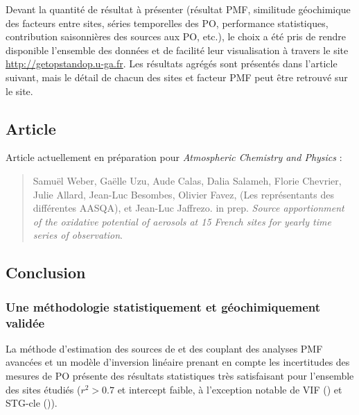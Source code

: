 \begin{tcolorbox}[colback=red!5!white,colframe=Melon,title=Note]
    Devant la quantité de résultat à présenter (résultat PMF, similitude géochimique des
    facteurs entre sites, séries temporelles des PO, performance statistiques,
    contribution saisonnières des sources aux PO, etc.), le choix a été pris de rendre
    disponible l'ensemble des données et de facilité leur visualisation à travers le site
    \url{http://getopstandop.u-ga.fr}.
    Les résultats agrégés sont présentés dans l'article suivant, mais le détail de chacun
    des sites et facteur PMF peut être retrouvé sur le site.
\end{tcolorbox}

\subsection{Article}%
\label{sub:article}

\begin{tcolorbox}[colback=red!5!white,colframe=Melon,title=Note]
Article actuellement en préparation pour \textit{Atmospheric Chemistry and Physics} :
\begin{quote}
    Samuël Weber, Gaëlle Uzu, Aude Calas, Dalia Salameh, Florie Chevrier, Julie Allard,
    Jean-Luc Besombes, Olivier Favez, (Les représentants des différentes AASQA), et
    Jean-Luc Jaffrezo. in prep.
    \textit{Source apportionment of the oxidative potential of aerosols at 15 French
    sites for yearly time series of observation}.
\end{quote}
\end{tcolorbox}



\subsection{Conclusion}%
\label{sec:conclusion_synthèse_OP}

\subsubsection{Une méthodologie statistiquement et géochimiquement validée}%
\label{ssub:une_méthodologie_statistiquement_et_géochimiquement_validée}

La méthode d'estimation des sources de \POAA{} et \PODTT{} des \PMdix{} couplant des
analyses PMF avancées et un modèle d'inversion linéaire prenant en compte les incertitudes
des mesures de PO présente des résultats statistiques très satisfaisant pour l'ensemble
des sites étudiés ($r^2>0.7$ et intercept faible, à l'exception notable de VIF (\PODTT) et
STG-cle (\POAA)).

